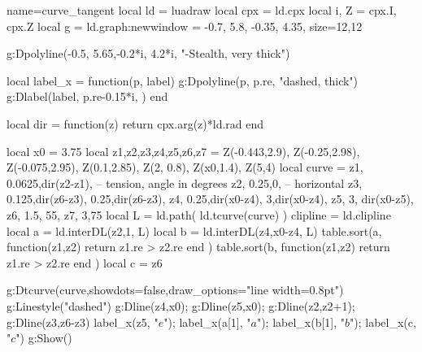 \documentclass[border=5pt]{standalone}
\begin{document}
\begin{luadraw}{name=curve_tangent}
local ld = luadraw
local cpx = ld.cpx
local i, Z = cpx.I, cpx.Z
local g = ld.graph:new{window = {-0.7, 5.8, -0.35, 4.35}, size={12,12}}

g:Dpolyline({{-0.5, 5.65},{-0.2*i, 4.2*i}}, "-Stealth, very thick")

local label_x = function(p, label)
   g:Dpolyline({p, p.re}, "dashed, thick")
   g:Dlabel(label, p.re-0.15*i, {})
end

local dir = function(z)
   return cpx.arg(z)*ld.rad
end

local x0 = 3.75
local z1,z2,z3,z4,z5,z6,z7 = Z(-0.443,2.9), Z(-0.25,2.98), Z(-0.075,2.95), Z(0.1,2.85), Z(2, 0.8), Z(x0,1.4), Z(5,4)
local curve = {
z1, {0.0625,dir(z2-z1)}, -- {tension, angle in degrees}
z2, {0.25,0}, -- horizontal
z3, {0.125,dir(z6-z3), 0.25,dir(z6-z3)},
z4, {0.25,dir(x0-z4), 3,dir(x0-z4)},
z5, {3, dir(x0-z5)},
z6, {1.5, 55},
z7, {3,75}
}
local L = ld.path( ld.tcurve(curve) )
clipline = ld.clipline
local a = ld.interDL({z2,1}, L) 
local b = ld.interDL({z4,x0-z4}, L)
table.sort(a, function(z1,z2) return z1.re > z2.re end )
table.sort(b, function(z1,z2) return z1.re > z2.re end )
local c = z6

g:Dtcurve(curve,{showdots=false,draw_options="line width=0.8pt"})
g:Linestyle("dashed")
g:Dline(z4,x0); g:Dline(z5,x0); 
g:Dline(z2,z2+1); g:Dline({z3,z6-z3})
label_x(z5, "$e$"); label_x(a[1], "$a$"); label_x(b[1], "$b$"); label_x(c, "$c$") 
g:Show()
\end{luadraw}
\end{document}
